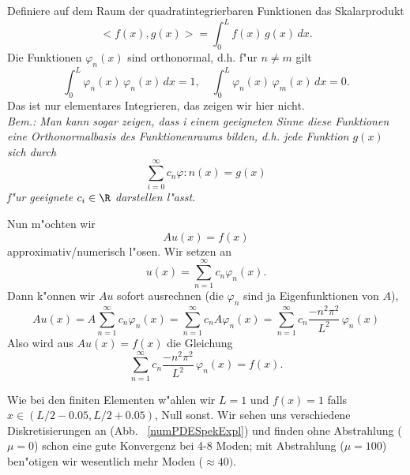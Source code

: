 Definiere auf dem Raum der quadratintegrierbaren Funktionen 
das Skalarprodukt
$$ <f(x),g(x)> = \int_0^L f(x)\, g(x)\, dx.$$
Die Funktionen $\varphi_n(x)$ sind orthonormal, d.h. 
f"ur $n\not = m$ gilt
$$\int_0^L \varphi_n(x)\, \varphi_n(x)\, dx = 1,\quad
\int_0^L \varphi_n(x)\, \varphi_m(x)\, dx = 0.$$
Das ist nur elementares Integrieren, das zeigen wir hier nicht.\\
{\it Bem.: Man kann sogar zeigen, dass i einem geeigneten Sinne diese Funktionen eine Orthonormalbasis des Funktionenraums bilden, d.h. jede Funktion $g(x)$ sich durch 
$$ \sum_{i=0}^\infty c_n \varphi:n(x) = g(x)$$
f"ur geeignete $c_i\in\R$ darstellen l"asst.
}\par\bigskip


Nun m"ochten wir 
$$A u(x) = f(x)$$
approximativ/numerisch l"osen. Wir setzen an
$$ u(x) = \sum_{n=1}^\infty c_n \varphi_n(x).$$
Dann k"onnen wir $Au$ sofort ausrechnen (die $\varphi_n$ sind
ja Eigenfunktionen von $A$),
$$A u(x) 
=  A \sum_{n=1}^\infty c_n \varphi_n(x)
=   \sum_{n=1}^\infty c_n A\varphi_n(x)
=   \sum_{n=1}^\infty c_n  \frac{- n^2\pi^2}{L^2}\, \varphi_n(x)
$$
Also wird aus $Au(x) = f(x)$ die Gleichung
$$ \sum_{n=1}^\infty c_n  \frac{- n^2\pi^2}{L^2}\, \varphi_n(x) = f(x).$$




\begin{bspX}
Wie bei den finiten Elementen w"ahlen wir
 $L=1$ und 
  $f(x) = 1$ falls $x\in (L/2-0.05, L/2+0.05)$, Null sonst. 
Wir sehen uns verschiedene Diskretisierungen an (Abb.~ \ref{numPDESpekExpl}) und finden ohne Abstrahlung ($\mu=0$) 
schon eine gute Konvergenz bei 4-8 Moden; mit Abstrahlung ($\mu=100$) 
ben"otigen wir wesentlich mehr Moden ($\approx 40)$. 

\end{bspX}

